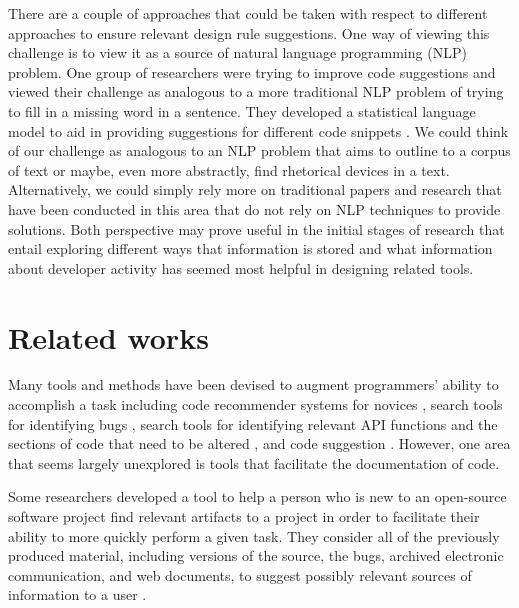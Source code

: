 \documentclass[12pt]{article}
\begin{document}
There are a couple of approaches that could be taken with respect to different approaches to ensure relevant design rule suggestions. One way of viewing this challenge is to view it as a source of natural language programming (NLP) problem. One group of researchers were trying to improve code suggestions and viewed their challenge as analogous to a more traditional NLP problem of trying to fill in a missing word in a sentence. They developed a statistical language model to aid in providing suggestions for different code snippets \cite{RaychevEtAl2014}. We could think of our challenge as analogous to an NLP problem that aims to outline to a corpus of text or maybe, even more abstractly, find rhetorical devices in a text. Alternatively, we could simply rely more on traditional papers and research that have been conducted in this area that do not rely on NLP techniques to provide solutions. Both perspective may prove useful in the initial stages of research that entail exploring different ways that information is stored and what information about developer activity has seemed most helpful in designing related tools. 





\clearpage


\section{Related works}\label{relatedWorks}

Many tools and methods have been devised to augment programmers' ability to accomplish a task including code recommender systems for novices \cite{HartmannEtAl2010}, search tools for identifying bugs \cite{HovemeyerPugh2004}, search tools for identifying relevant API functions and the sections of code that need to be altered \cite{RongEtAl2016}, and code suggestion \cite{RaychevEtAl2014}. However, one area that seems largely unexplored is tools that facilitate the documentation of code.

Some researchers developed a tool to help a person who is new to an open-source software project find relevant artifacts to a project in order to facilitate their ability to more quickly perform a given task. They consider all of the previously produced material, including versions of the source, the bugs, archived electronic communication, and web documents, to suggest possibly relevant sources of information to a user \cite{CubranicMurphy2003}.
\end{document}
